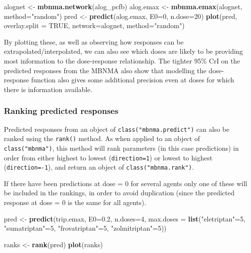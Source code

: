 \documentclass[]{article}
\newenvironment{Shaded}{\begin{snugshade}}{\end{snugshade}}
\newcommand{\DataTypeTok}[1]{\textcolor[rgb]{0.13,0.29,0.53}{#1}}
\newcommand{\DecValTok}[1]{\textcolor[rgb]{0.00,0.00,0.81}{#1}}
\newcommand{\FloatTok}[1]{\textcolor[rgb]{0.00,0.00,0.81}{#1}}
\newcommand{\KeywordTok}[1]{\textcolor[rgb]{0.13,0.29,0.53}{\textbf{#1}}}
\newcommand{\NormalTok}[1]{#1}
\newcommand{\OtherTok}[1]{\textcolor[rgb]{0.56,0.35,0.01}{#1}}
\newcommand{\StringTok}[1]{\textcolor[rgb]{0.31,0.60,0.02}{#1}}
\begin{document}
\begin{Shaded}
\begin{Highlighting}[]
\NormalTok{alognet <-}\StringTok{ }\KeywordTok{mbnma.network}\NormalTok{(alog_pcfb)}
\NormalTok{alog.emax <-}\StringTok{ }\KeywordTok{mbnma.emax}\NormalTok{(alognet, }\DataTypeTok{method=}\StringTok{"random"}\NormalTok{)}
\NormalTok{pred <-}\StringTok{ }\KeywordTok{predict}\NormalTok{(alog.emax, }\DataTypeTok{E0=}\DecValTok{0}\NormalTok{, }\DataTypeTok{n.dose=}\DecValTok{20}\NormalTok{)}
\KeywordTok{plot}\NormalTok{(pred, }\DataTypeTok{overlay.split =} \OtherTok{TRUE}\NormalTok{, }\DataTypeTok{network=}\NormalTok{alognet, }\DataTypeTok{method=}\StringTok{"random"}\NormalTok{)}
\end{Highlighting}
\end{Shaded}

By plotting these, as well as observing how responses can be
extrapolated/interpolated, we can also see which doses are likely to be
providing most information to the dose-response relationship. The
tighter 95\% CrI on the predicted responses from the MBNMA also show
that modelling the dose-response function also gives some additional
precision even at doses for which there is information available.

\hypertarget{ranking-predicted-responses}{%
\subsubsection{Ranking predicted
responses}\label{ranking-predicted-responses}}

Predicted responses from an object of \texttt{class("mbnma.predict")}
can also be ranked using the \texttt{rank()} method. As when applied to
an object of \texttt{class("mbnma")}, this method will rank parameters
(in this case predictions) in order from either highest to lowest
(\texttt{direction=1}) or lowest to highest (\texttt{direction=-1}), and
return an object of \texttt{class("mbnma.rank")}.

If there have been predictions at dose = 0 for several agents only one
of these will be included in the rankings, in order to avoid duplication
(since the predicted response at dose = 0 is the same for all agents).

\begin{Shaded}
\begin{Highlighting}[]
\NormalTok{pred <-}\StringTok{ }\KeywordTok{predict}\NormalTok{(trip.emax, }\DataTypeTok{E0=}\FloatTok{0.2}\NormalTok{, }\DataTypeTok{n.doses=}\DecValTok{4}\NormalTok{,}
                \DataTypeTok{max.doses =} \KeywordTok{list}\NormalTok{(}\StringTok{"eletriptan"}\NormalTok{=}\DecValTok{5}\NormalTok{, }\StringTok{"sumatriptan"}\NormalTok{=}\DecValTok{5}\NormalTok{, }
                              \StringTok{"frovatriptan"}\NormalTok{=}\DecValTok{5}\NormalTok{, }\StringTok{"zolmitriptan"}\NormalTok{=}\DecValTok{5}\NormalTok{))}

\NormalTok{ranks <-}\StringTok{ }\KeywordTok{rank}\NormalTok{(pred)}
\KeywordTok{plot}\NormalTok{(ranks)}
\end{Highlighting}
\end{Shaded}
\end{document}
